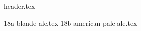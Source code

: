 \clearpage
{}
\divisorLine
{header.tex}
\begin{multicols*}{2}
{18a-blonde-ale.tex}
{18b-american-pale-ale.tex}
\end{multicols*}